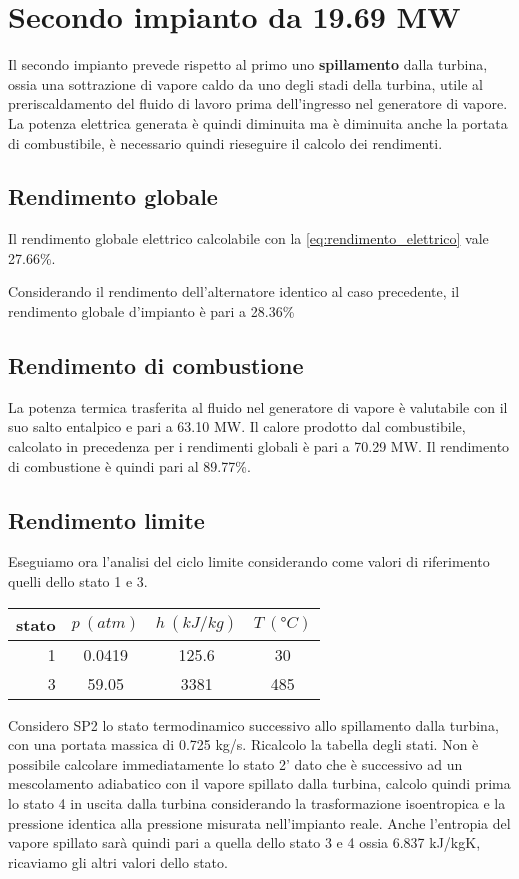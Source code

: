 \section{Secondo impianto da 19.69 MW}
Il secondo impianto prevede rispetto al primo uno \textbf{spillamento} dalla turbina, ossia una sottrazione di vapore caldo da uno degli stadi della turbina, 
utile al preriscaldamento del fluido di lavoro prima dell'ingresso nel generatore di vapore.
La potenza elettrica generata è quindi diminuita ma è diminuita anche la portata di combustibile, è necessario quindi rieseguire il calcolo dei rendimenti.
\subsection{Rendimento globale}
Il rendimento globale elettrico calcolabile con la \eqref{eq:rendimento_elettrico} vale 27.66\%.

Considerando il rendimento dell'alternatore identico al caso precedente, il rendimento globale d'impianto è pari a 28.36\%
\subsection{Rendimento di combustione}
La potenza termica trasferita al fluido nel generatore di vapore è valutabile con il suo salto entalpico e pari a 63.10 MW.
Il calore prodotto dal combustibile, calcolato in precedenza per i rendimenti globali è pari a 70.29 MW.
Il rendimento di combustione è quindi pari al 89.77\%.

\subsection{Rendimento limite}
\label{subsec:rendimento_limite_2}
Eseguiamo ora l'analisi del ciclo limite considerando come valori di riferimento quelli dello stato 1 e 3.
\begin{center}
    \begin{tabular}{r|c|c|c}
        stato    & $p\ (atm)$ & $h\ (kJ/kg)$ & $T\ (\text{°}C) $\\ \hline
        1   &        0.0419 &          125.6   &           30     \\ \hline
        3   &        59.05  &           3381   &           485
    \end{tabular}
\end{center}
Considero SP2 lo stato termodinamico successivo allo spillamento dalla turbina, con una portata massica di 0.725 kg/s. Ricalcolo la tabella degli stati.
Non è possibile calcolare immediatamente lo stato 2' dato che è successivo ad un mescolamento adiabatico con il vapore spillato dalla turbina, calcolo quindi prima
lo stato 4 in uscita dalla turbina considerando la trasformazione isoentropica e la pressione identica alla pressione misurata nell'impianto reale.
Anche l'entropia del vapore spillato sarà quindi pari a quella dello stato 3 e 4 ossia 6.837 kJ/kgK, ricaviamo gli altri valori dello stato.


